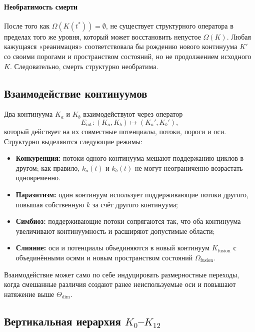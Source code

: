 \paragraph{Необратимость смерти}
После того как \(\Omega(K(t^\ast)) = \emptyset\), не существует структурного оператора в пределах
того же уровня, который может восстановить непустое \(\Omega(K)\).
Любая кажущаяся «реанимация» соответствовала бы рождению нового континуума \(K'\) со своими
порогами и пространством состояний, но не продолжением исходного \(K\).
Следовательно, смерть структурно необратима.

\subsection{Взаимодействие континуумов}

Два континуума \(K_a\) и \(K_b\) взаимодействуют через оператор
\[
    E_{\mathrm{int}} : (K_a,K_b) \mapsto (K_a',K_b'),
\]
который действует на их совместные потенциалы, потоки, пороги и оси.
Структурно выделяются следующие режимы:

\begin{itemize}
    \item \textbf{Конкуренция:} потоки одного континуума мешают поддержанию циклов в другом;
          как правило, \(k_a(t)\) и \(k_b(t)\) не могут неограниченно возрастать одновременно.
    \item \textbf{Паразитизм:} один континуум использует поддерживающие потоки другого,
          повышая собственную \(k\) за счёт другого континуума;
    \item \textbf{Симбиоз:} поддерживающие потоки сопрягаются так, что оба континуума
          увеличивают континуумность и расширяют допустимые области;
    \item \textbf{Слияние:} оси и потенциалы объединяются в новый континуум
          \(K_{\mathrm{fusion}}\) с объединёнными осями и новым пространством состояний
          \(\Omega_{\mathrm{fusion}}\).
\end{itemize}

Взаимодействие может само по себе индуцировать размерностные переходы,
когда смешанные различия создают ранее неиспользуемые оси и повышают натяжение выше
\(\Theta_{\mathrm{dim}}\).

\subsection{Вертикальная иерархия \texorpdfstring{$K_0$--$K_{12}$}{K0--K12}}

